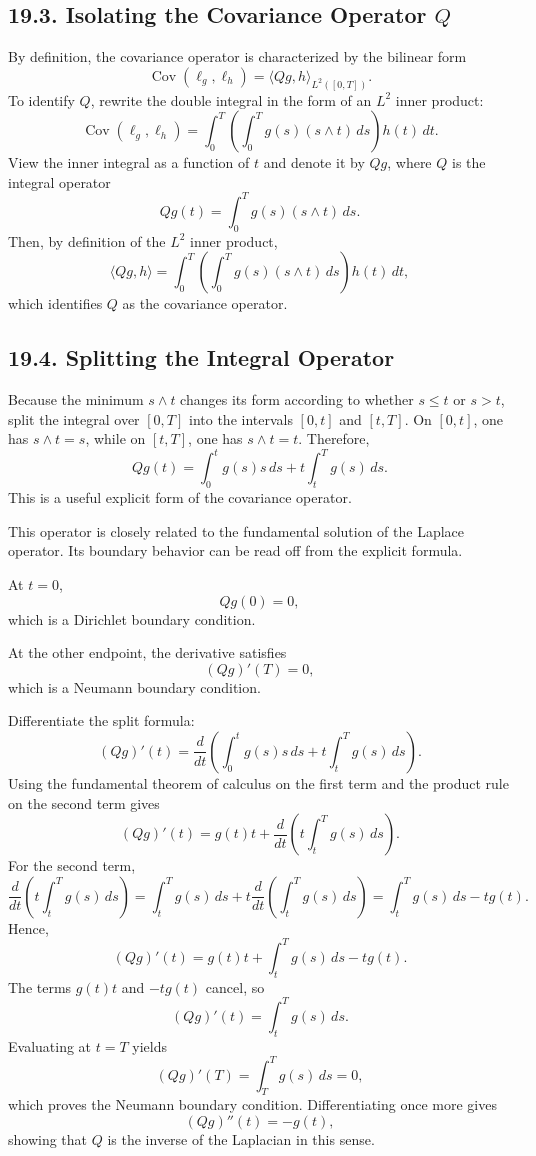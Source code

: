 \documentclass[11pt]{article}
\theoremstyle{definition}
\theoremstyle{remark}
\begin{document}
\subsection*{19.3. Isolating the Covariance Operator $Q$}
By definition, the covariance operator is characterized by the bilinear form
\[
\operatorname{Cov}(\ell_g,\ell_h)=\langle Qg,h\rangle_{L^2([0,T])}.
\]
To identify $Q$, rewrite the double integral in the form of an $L^2$ inner product:
\[
\operatorname{Cov}(\ell_g,\ell_h)
=
\int_0^T \left(\int_0^T g(s)(s\wedge t)\,ds\right)h(t)\,dt.
\]
View the inner integral as a function of $t$ and denote it by $Qg$, where $Q$ is the integral operator
\[
Qg(t)=\int_0^T g(s)(s\wedge t)\,ds.
\]
Then, by definition of the $L^2$ inner product,
\[
\langle Qg,h\rangle
=
\int_0^T \left(\int_0^T g(s)(s\wedge t)\,ds\right)h(t)\,dt,
\]
which identifies $Q$ as the covariance operator.

\subsection*{19.4. Splitting the Integral Operator}
Because the minimum $s\wedge t$ changes its form according to whether $s\le t$ or $s>t$, split the integral over $[0,T]$ into the intervals $[0,t]$ and $[t,T]$. On $[0,t]$, one has $s\wedge t=s$, while on $[t,T]$, one has $s\wedge t=t$. Therefore,
\[
Qg(t)
=
\int_0^t g(s)s\,ds+t\int_t^T g(s)\,ds.
\]
This is a useful explicit form of the covariance operator.

This operator is closely related to the fundamental solution of the Laplace operator. Its boundary behavior can be read off from the explicit formula.

At $t=0$,
\[
Qg(0)=0,
\]
which is a Dirichlet boundary condition.

At the other endpoint, the derivative satisfies
\[
(Qg)'(T)=0,
\]
which is a Neumann boundary condition.

Differentiate the split formula:
\[
(Qg)'(t)
=
\frac{d}{dt}\left(\int_0^t g(s)s\,ds+t\int_t^T g(s)\,ds\right).
\]
Using the fundamental theorem of calculus on the first term and the product rule on the second term gives
\[
(Qg)'(t)
=
g(t)t+\frac{d}{dt}\left(t\int_t^T g(s)\,ds\right).
\]
For the second term,
\[
\frac{d}{dt}\left(t\int_t^T g(s)\,ds\right)
=
\int_t^T g(s)\,ds+t\frac{d}{dt}\left(\int_t^T g(s)\,ds\right)
=
\int_t^T g(s)\,ds-tg(t).
\]
Hence,
\[
(Qg)'(t)=g(t)t+\int_t^T g(s)\,ds-tg(t).
\]
The terms $g(t)t$ and $-tg(t)$ cancel, so
\[
(Qg)'(t)=\int_t^T g(s)\,ds.
\]
Evaluating at $t=T$ yields
\[
(Qg)'(T)=\int_T^T g(s)\,ds=0,
\]
which proves the Neumann boundary condition. Differentiating once more gives
\[
(Qg)''(t)=-g(t),
\]
showing that $Q$ is the inverse of the Laplacian in this sense.
\end{document}
